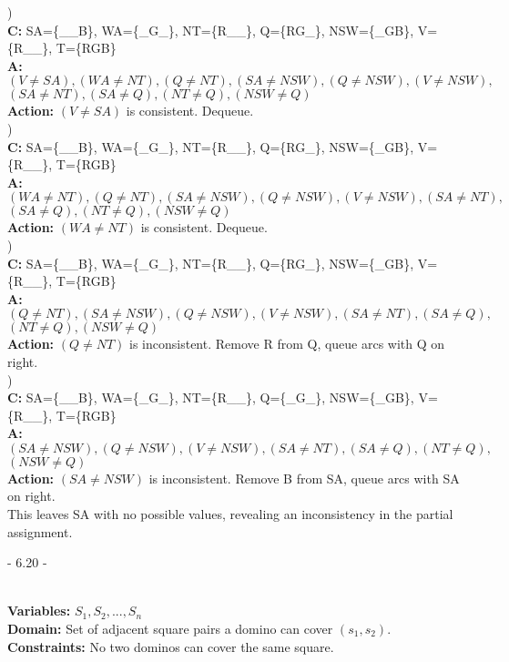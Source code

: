 \documentclass[12pt]{article}
\begin{document}
)\hrulefill\\
\textbf{C:} SA=\{\_\_B\}, WA=\{\_G\_\}, NT=\{R\_\_\}, Q=\{RG\_\}, NSW=\{\_GB\}, V=\{R\_\_\}, T=\{RGB\}\\
\textbf{A:} $(V\neq SA), (WA\neq NT), (Q\neq NT), (SA\neq NSW), (Q\neq NSW), (V\neq NSW), $ \\
\indent $(SA\neq NT), (SA\neq Q), (NT\neq Q), (NSW\neq Q)$\\
\textbf{Action:} $(V\neq SA)$ is consistent. Dequeue.\\

)\hrulefill\\
\textbf{C:} SA=\{\_\_B\}, WA=\{\_G\_\}, NT=\{R\_\_\}, Q=\{RG\_\}, NSW=\{\_GB\}, V=\{R\_\_\}, T=\{RGB\}\\
\textbf{A:} $(WA\neq NT), (Q\neq NT), (SA\neq NSW), (Q\neq NSW), (V\neq NSW), (SA\neq NT), $ \\
\indent $(SA\neq Q), (NT\neq Q), (NSW\neq Q)$\\
\textbf{Action:} $(WA\neq NT)$ is consistent. Dequeue.\\

)\hrulefill\\
\textbf{C:} SA=\{\_\_B\}, WA=\{\_G\_\}, NT=\{R\_\_\}, Q=\{RG\_\}, NSW=\{\_GB\}, V=\{R\_\_\}, T=\{RGB\}\\
\textbf{A:} $(Q\neq NT), (SA\neq NSW), (Q\neq NSW), (V\neq NSW), (SA\neq NT), (SA\neq Q),$ \\
\indent $(NT\neq Q), (NSW\neq Q)$\\
\textbf{Action:} $(Q\neq NT)$ is inconsistent. Remove R from Q, queue arcs with Q on right.\\

)\hrulefill\\
\textbf{C:} SA=\{\_\_B\}, WA=\{\_G\_\}, NT=\{R\_\_\}, Q=\{\_G\_\}, NSW=\{\_GB\}, V=\{R\_\_\}, T=\{RGB\}\\
\textbf{A:} $(SA\neq NSW), (Q\neq NSW), (V\neq NSW), (SA\neq NT), (SA\neq Q), (NT\neq Q), $ \\
\indent $(NSW\neq Q)$\\
\textbf{Action:} $(SA\neq NSW)$ is inconsistent. Remove B from SA, queue arcs with SA on right.\\

\noindent This leaves SA with no possible values, revealing an inconsistency in the partial assignment.






\centerline{- 6.20 - }
\ \\
\noindent \textbf{Variables:} $S_1, S_2, ..., S_n$\\
\textbf{Domain:} Set of adjacent square pairs a domino can cover $(s_1, s_2)$.\\
\textbf{Constraints:} No two dominos can cover the same square.\\
\end{document}
